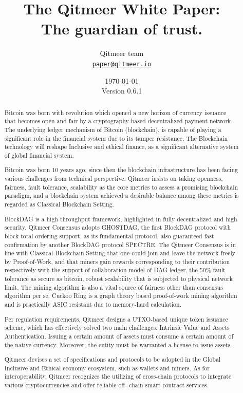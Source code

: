 \documentclass[a4paper,11pt]{article}
\title{\LARGE The Qitmeer White Paper:\\
	\Large The guardian of trust.}
\author{
	Qitmeer team\\
		\small\href{mailto:paper@qitmeer.io}
			{\nolinkurl{paper@qitmeer.io}}
	}
\date{\today\\\small Version 0.6.1}
\newcommand{\watermark}[3]{\AddToShipoutPictureBG{
	\parbox[b][\paperheight]{\paperwidth}{
		\vfill%
		\centering%
	\tikz[remember picture, overlay]%
	  \node [rotate = #1, scale = #2] at (current page.center)%
	      {\textcolor{gray!80!cyan!30}{#3}};
	  \vfill}}}
\begin{document}
\clearpage
\pagestyle{plain}

\maketitle


\begin{abstract}
Bitcoin\cite{bitcoin} was born with revolution which opened a new horizon of currency issuance that becomes open and fair by a cryptography-based decentralized payment network. The underlying ledger mechanism of Bitcoin (blockchain), is capable of playing a significant role in the financial system due to its tamper resistance. The Blockchain technology will reshape Inclusive and ethical finance, as a significant alternative system of global financial system.

Bitcoin was born 10 years ago, since then the blockchain infrastructure has been facing various challenges from technical perspective. Qitmeer insists on taking openness, fairness, fault tolerance, scalability as the core metrics to assess a promising blockchain paradigm, and a blockchain system achieved a desirable balance among these metrics is regarded as Classical Blockchain Setting.

BlockDAG is a high throughput framework, highlighted in fully decentralized and high security.
Qitmeer Consensus adopts GHOSTDAG, the first BlockDAG protocol with block total ordering support, as its fundamental protocol, also guaranteed fast confirmation by another BlockDAG protocol SPECTRE.
The Qitmeer Consensus is in line with Classical Blockchain Setting that one could join and leave the network freely by Proof-of-Work, and that miners gain rewards corresponding to their contribution respectively with the support of collaboration model of DAG ledger, the 50\% fault tolerance as secure as bitcoin, robust scalability that is subjected to physical network limit. The mining algorithm is also a vital source of fairness other than consensus algorithm per se. Cuckoo Ring is a graph theory based proof-of-work mining algorithm and is practically ASIC resistant due to memory-hard calculation. 

Per regulation requirements, Qitmeer designs a UTXO-based unique token issuance scheme, which has effectively solved two main challenges: Intrinsic Value and Assets Authentication. Issuing a certain amount of assets must consume a certain amount of the native currency. Moreover, the entity must be warranted a license to issue assets. 

Qitmeer devises a set of specifications and protocols to be adopted in the Global Inclusive and Ethical economy ecosystem, such as wallets and miners. As for interoperability, Qitmeer recognizes the utilizing of cross-chain protocols to integrate various cryptocurrencies and offer reliable off- chain smart contract services.

\end{abstract}
\end{document}
